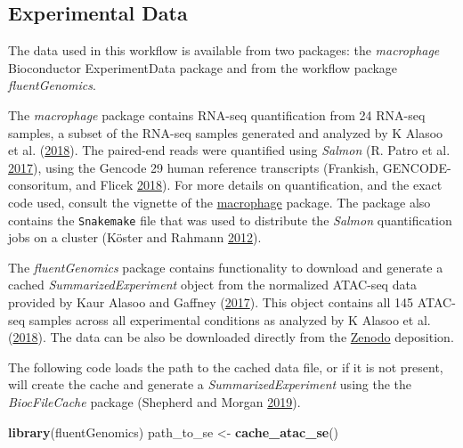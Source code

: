 \documentclass[
]{article}
\newenvironment{Shaded}{}{}
\newcommand{\KeywordTok}[1]{\textcolor[rgb]{0.00,0.44,0.13}{\textbf{#1}}}
\newcommand{\NormalTok}[1]{#1}
\newcommand{\StringTok}[1]{\textcolor[rgb]{0.25,0.44,0.63}{#1}}
\begin{document}
\hypertarget{experimental-data}{%
\subsection{Experimental Data}\label{experimental-data}}

The data used in this workflow is available from two packages: the \emph{macrophage}
Bioconductor ExperimentData package and from the workflow package
\emph{fluentGenomics}.

The \emph{macrophage} package contains RNA-seq quantification from 24 RNA-seq
samples, a subset of the RNA-seq samples generated and analyzed by K Alasoo et al. (\protect\hyperlink{ref-alasoo}{2018}). The
paired-end reads were quantified using \emph{Salmon} (R. Patro et al. \protect\hyperlink{ref-salmon}{2017}), using the Gencode 29
human reference transcripts (Frankish, GENCODE-consoritum, and Flicek \protect\hyperlink{ref-gencode}{2018}). For more details on quantification, and
the exact code used, consult the vignette of the
\href{http://bioconductor.org/packages/macrophage}{macrophage} package. The package
also contains the \texttt{Snakemake} file that was used to distribute the \emph{Salmon}
quantification jobs on a cluster (Köster and Rahmann \protect\hyperlink{ref-snakemake}{2012}).

The \emph{fluentGenomics} package contains functionality to download and generate a
cached \emph{SummarizedExperiment} object from the normalized ATAC-seq data provided
by Kaur Alasoo and Gaffney (\protect\hyperlink{ref-alasooZenodo}{2017}). This object contains all 145 ATAC-seq samples across all
experimental conditions as analyzed by K Alasoo et al. (\protect\hyperlink{ref-alasoo}{2018}). The data can be also be
downloaded directly from the
\href{https://zenodo.org/record/1188300\#.XIAhXlNKjOQ}{Zenodo} deposition.

The following code loads the path to the cached data file, or if it is not
present, will create the cache and generate a \emph{SummarizedExperiment} using the
the \emph{BiocFileCache} package (Shepherd and Morgan \protect\hyperlink{ref-bcfilecache}{2019}).

\begin{Shaded}
\begin{Highlighting}[]
\KeywordTok{library}\NormalTok{(fluentGenomics)}
\NormalTok{path_to_se <-}\StringTok{ }\KeywordTok{cache_atac_se}\NormalTok{()}
\end{Highlighting}
\end{Shaded}
\end{document}

